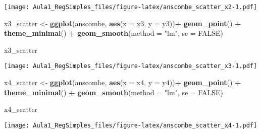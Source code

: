 \documentclass[]{article}
\newenvironment{Shaded}{\begin{snugshade}}{\end{snugshade}}
\newcommand{\DataTypeTok}[1]{\textcolor[rgb]{0.13,0.29,0.53}{#1}}
\newcommand{\KeywordTok}[1]{\textcolor[rgb]{0.13,0.29,0.53}{\textbf{#1}}}
\newcommand{\NormalTok}[1]{#1}
\newcommand{\OperatorTok}[1]{\textcolor[rgb]{0.81,0.36,0.00}{\textbf{#1}}}
\newcommand{\OtherTok}[1]{\textcolor[rgb]{0.56,0.35,0.01}{#1}}
\newcommand{\StringTok}[1]{\textcolor[rgb]{0.31,0.60,0.02}{#1}}
\begin{document}
\texttt{[image: Aula1\_RegSimples\_files/figure-latex/anscombe\_scatter\_x2-1.pdf]}

\begin{Shaded}
\begin{Highlighting}[]
\NormalTok{x3_scatter <-}\StringTok{ }\KeywordTok{ggplot}\NormalTok{(anscombe, }\KeywordTok{aes}\NormalTok{(}\DataTypeTok{x =}\NormalTok{ x3, }\DataTypeTok{y =}\NormalTok{ y3))}\OperatorTok{+}
\StringTok{  }\KeywordTok{geom_point}\NormalTok{() }\OperatorTok{+}
\StringTok{  }\KeywordTok{theme_minimal}\NormalTok{() }\OperatorTok{+}
\StringTok{  }\KeywordTok{geom_smooth}\NormalTok{(}\DataTypeTok{method =} \StringTok{"lm"}\NormalTok{, }\DataTypeTok{se =} \OtherTok{FALSE}\NormalTok{)}

\NormalTok{x3_scatter}
\end{Highlighting}
\end{Shaded}

\texttt{[image: Aula1\_RegSimples\_files/figure-latex/anscombe\_scatter\_x3-1.pdf]}

\begin{Shaded}
\begin{Highlighting}[]
\NormalTok{x4_scatter <-}\StringTok{ }\KeywordTok{ggplot}\NormalTok{(anscombe, }\KeywordTok{aes}\NormalTok{(}\DataTypeTok{x =}\NormalTok{ x4, }\DataTypeTok{y =}\NormalTok{ y4))}\OperatorTok{+}
\StringTok{  }\KeywordTok{geom_point}\NormalTok{() }\OperatorTok{+}
\StringTok{  }\KeywordTok{theme_minimal}\NormalTok{() }\OperatorTok{+}
\StringTok{  }\KeywordTok{geom_smooth}\NormalTok{(}\DataTypeTok{method =} \StringTok{"lm"}\NormalTok{, }\DataTypeTok{se =} \OtherTok{FALSE}\NormalTok{)}

\NormalTok{x4_scatter}
\end{Highlighting}
\end{Shaded}

\texttt{[image: Aula1\_RegSimples\_files/figure-latex/anscombe\_scatter\_x4-1.pdf]}
\end{document}
